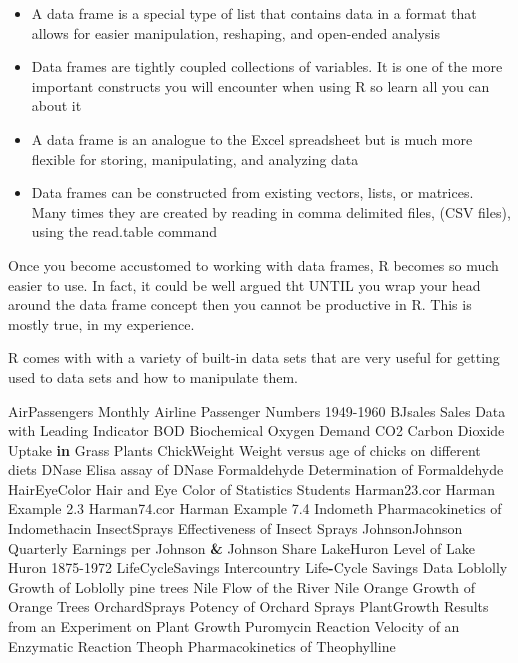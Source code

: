 \documentclass[]{book}
\newenvironment{Shaded}{\begin{snugshade}}{\end{snugshade}}
\newcommand{\ControlFlowTok}[1]{\textcolor[rgb]{0.13,0.29,0.53}{\textbf{#1}}}
\newcommand{\DecValTok}[1]{\textcolor[rgb]{0.00,0.00,0.81}{#1}}
\newcommand{\FloatTok}[1]{\textcolor[rgb]{0.00,0.00,0.81}{#1}}
\newcommand{\NormalTok}[1]{#1}
\newcommand{\OperatorTok}[1]{\textcolor[rgb]{0.81,0.36,0.00}{\textbf{#1}}}
\newcommand{\StringTok}[1]{\textcolor[rgb]{0.31,0.60,0.02}{#1}}
\begin{document}
\begin{itemize}
\item
  A data frame is a special type of list that contains data in a format that allows for easier manipulation, reshaping, and open-ended analysis
\item
  Data frames are tightly coupled collections of variables. It is one of the more important constructs you will encounter when using R so learn all you can about it
\item
  A data frame is an analogue to the Excel spreadsheet but is much more flexible for storing, manipulating, and analyzing data
\item
  Data frames can be constructed from existing vectors, lists, or matrices. Many times they are created by reading in comma delimited files, (CSV files), using the read.table command
\end{itemize}

Once you become accustomed to working with data frames, R becomes so much easier to use. In fact, it could be well argued tht UNTIL you wrap your head around the data frame concept then you cannot be productive in R. This is mostly true, in my experience.

R comes with with a variety of built-in data sets that are very useful for getting used to data sets and how to manipulate them.

\begin{Shaded}
\begin{Highlighting}[]
\NormalTok{AirPassengers           Monthly Airline Passenger Numbers }\DecValTok{1949-1960}
\NormalTok{BJsales                 Sales Data with Leading Indicator}
\NormalTok{BOD                     Biochemical Oxygen Demand}
\NormalTok{CO2                     Carbon Dioxide Uptake }\ControlFlowTok{in}\NormalTok{ Grass Plants}
\NormalTok{ChickWeight             Weight versus age of chicks on different diets}
\NormalTok{DNase                   Elisa assay of DNase}
\NormalTok{Formaldehyde            Determination of Formaldehyde}
\NormalTok{HairEyeColor            Hair and Eye Color of Statistics Students}
\NormalTok{Harman23.cor            Harman Example }\FloatTok{2.3}
\NormalTok{Harman74.cor            Harman Example }\FloatTok{7.4}
\NormalTok{Indometh                Pharmacokinetics of Indomethacin}
\NormalTok{InsectSprays            Effectiveness of Insect Sprays}
\NormalTok{JohnsonJohnson          Quarterly Earnings per Johnson }\OperatorTok{&}\StringTok{ }\NormalTok{Johnson Share}
\NormalTok{LakeHuron               Level of Lake Huron }\DecValTok{1875-1972}
\NormalTok{LifeCycleSavings        Intercountry Life}\OperatorTok{-}\NormalTok{Cycle Savings Data}
\NormalTok{Loblolly                Growth of Loblolly pine trees}
\NormalTok{Nile                    Flow of the River Nile}
\NormalTok{Orange                  Growth of Orange Trees}
\NormalTok{OrchardSprays           Potency of Orchard Sprays}
\NormalTok{PlantGrowth             Results from an Experiment on Plant Growth}
\NormalTok{Puromycin               Reaction Velocity of an Enzymatic Reaction}
\NormalTok{Theoph                  Pharmacokinetics of Theophylline}
\end{Highlighting}
\end{Shaded}
\end{document}
